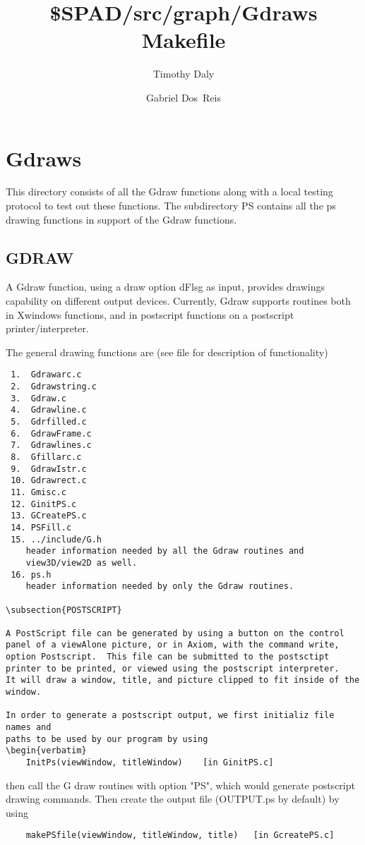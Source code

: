 \documentclass{article}
\title{\$SPAD/src/graph/Gdraws Makefile}
\author{Timothy Daly \and Gabriel Dos~Reis}
\begin{document}
\maketitle

\begin{abstract}
\end{abstract}
\eject

\tableofcontents
\eject

\section{Gdraws}

This directory consists of all the Gdraw functions along with a local
testing protocol to test out these functions.
The subdirectory PS contains all the ps drawing functions in support of
the Gdraw functions.

\subsection{GDRAW}

A Gdraw function, using a draw option dFlsg as input, provides drawings
capability on different output devices.  Currently, Gdraw supports routines
both in Xwindows functions, and in postscript functions on
a postscript printer/interpreter.

The general drawing functions are (see file for description of functionality)
\begin{verbatim}
 1.  Gdrawarc.c
 2.  Gdrawstring.c
 3.  Gdraw.c
 4.  Gdrawline.c
 5.  Gdrfilled.c
 6.  GdrawFrame.c
 7.  Gdrawlines.c
 8.  Gfillarc.c
 9.  GdrawIstr.c
 10. Gdrawrect.c
 11. Gmisc.c
 12. GinitPS.c
 13. GCreatePS.c
 14. PSFill.c
 15. ../include/G.h
    header information needed by all the Gdraw routines and
    view3D/view2D as well.
 16. ps.h
    header information needed by only the Gdraw routines.

\subsection{POSTSCRIPT}

A PostScript file can be generated by using a button on the control
panel of a viewAlone picture, or in Axiom, with the command write,
option Postscript.  This file can be submitted to the postsctipt
printer to be printed, or viewed using the postscript interpreter.  
It will draw a window, title, and picture clipped to fit inside of the
window.

In order to generate a postscript output, we first initializ file names and
paths to be used by our program by using
\begin{verbatim}
	InitPs(viewWindow, titleWindow)    [in GinitPS.c]
\end{verbatim}
then call the G draw routines with option "PS", which would generate postscript
drawing commands.  Then create the output file (OUTPUT.ps by default) by using
\begin{verbatim}
	makePSfile(viewWindow, titleWindow, title)   [in GcreatePS.c]
\end{verbatim}
\end{document}
